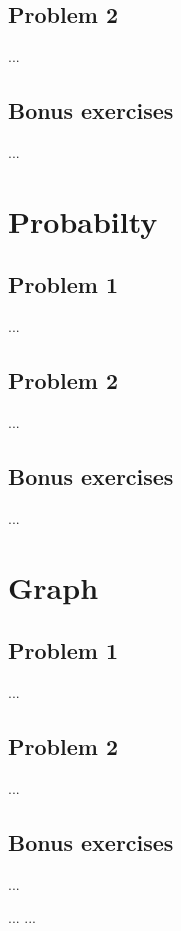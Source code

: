 \documentclass[a4paper]{article}
\begin{document}
\subsection{Problem 2}
...

\subsection{Bonus exercises}
...

\section{Probabilty}
\subsection{Problem 1}
...

\subsection{Problem 2}
...

\subsection{Bonus exercises}
...



\section{Graph}
\subsection{Problem 1}
...

\subsection{Problem 2}
...

\subsection{Bonus exercises}
...

\newpage
{}
\begin{thebibliography}{80}
	...
	...
	
	
\end{thebibliography}
\end{document}
